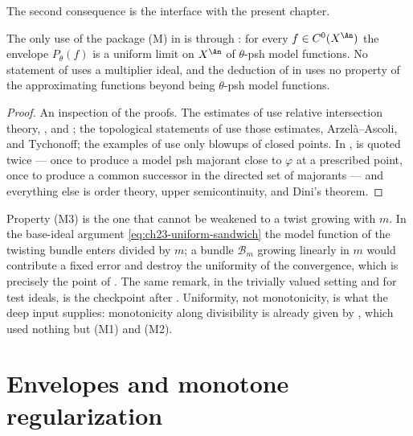 The second consequence is the interface with the present chapter.

\begin{proposition}
\label{prop:ch22-multiplier-interface}
The only use of the package \textup{(M)} in
 is through
: for every $f\in C^0(X^{\An})$ the
envelope $P_\theta(f)$ is a uniform limit on $X^{\An}$ of
$\theta$-psh model functions.  No statement of
 uses a multiplier ideal, and the deduction
of  in
 uses no property of the approximating
functions beyond being $\theta$-psh model functions.
\end{proposition}

\begin{proof}
An inspection of the proofs.  The estimates of
 use relative intersection theory,
, and ; the
topological statements of
 use those estimates, Arzel\`a--Ascoli, and
Tychonoff; the examples of  use only blowups of closed
points.  In ,
 is quoted twice --- once to produce a
model psh majorant close to $\varphi$ at a prescribed point, once to
produce a common successor in the directed set of majorants --- and
everything else is order theory, upper semicontinuity, and Dini's theorem.
\end{proof}

\begin{remark}
\label{rem:ch22-fixed-twist}
Property (M3) is the one that cannot be weakened to a twist growing with
$m$.  In the base-ideal argument
\eqref{eq:ch23-uniform-sandwich} the model function of the twisting bundle
enters divided by $m$; a bundle $\mathcal B_m$ growing linearly in
$m$ would contribute a fixed error and destroy the uniformity of the
convergence, which is precisely the point of
.  The same remark, in the
trivially valued setting and for test ideals, is the checkpoint after
.  Uniformity, not
monotonicity, is what the deep input supplies: monotonicity along
divisibility is already given by
, which used nothing but (M1) and (M2).
\end{remark}

\section{Envelopes and monotone regularization}
\label{sec:ch22-regularization}

